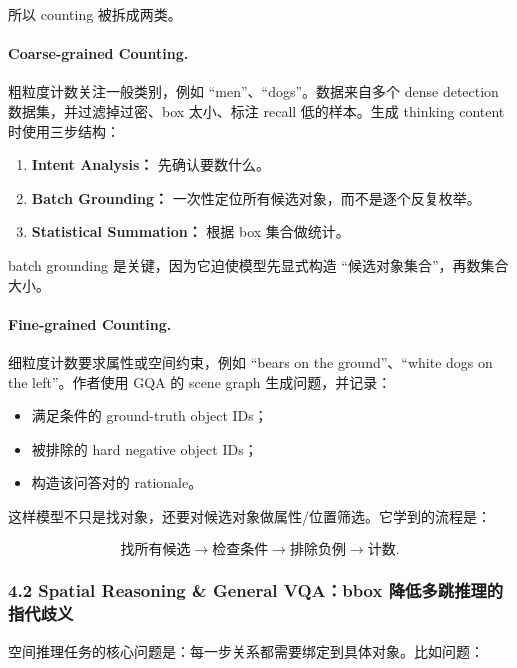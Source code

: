 所以 counting 被拆成两类。

\paragraph{Coarse-grained Counting.}

粗粒度计数关注一般类别，例如 ``men''、``dogs''。数据来自多个 dense detection 数据集，并过滤掉过密、box 太小、标注 recall 低的样本。生成 thinking content 时使用三步结构：

\begin{enumerate}[leftmargin=1.5em]
  \item \textbf{Intent Analysis：} 先确认要数什么。
  \item \textbf{Batch Grounding：} 一次性定位所有候选对象，而不是逐个反复枚举。
  \item \textbf{Statistical Summation：} 根据 box 集合做统计。
\end{enumerate}

batch grounding 是关键，因为它迫使模型先显式构造 ``候选对象集合''，再数集合大小。

\paragraph{Fine-grained Counting.}

细粒度计数要求属性或空间约束，例如 ``bears on the ground''、``white dogs on the left''。作者使用 GQA 的 scene graph 生成问题，并记录：

\begin{itemize}[leftmargin=1.5em]
  \item 满足条件的 ground-truth object IDs；
  \item 被排除的 hard negative object IDs；
  \item 构造该问答对的 rationale。
\end{itemize}

这样模型不只是找对象，还要对候选对象做属性/位置筛选。它学到的流程是：

\[
\text{找所有候选} \rightarrow \text{检查条件} \rightarrow \text{排除负例} \rightarrow \text{计数}.
\]

\subsubsection{4.2 Spatial Reasoning \& General VQA：bbox 降低多跳推理的指代歧义}

空间推理任务的核心问题是：每一步关系都需要绑定到具体对象。比如问题：

